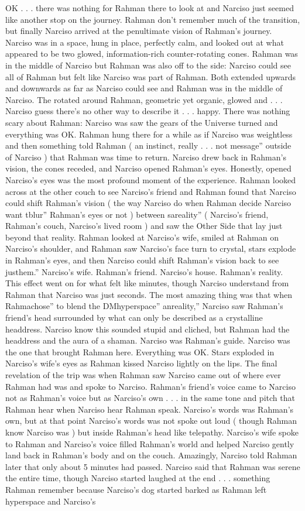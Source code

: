 \documentclass[12pt]{book}
\begin{document}
OK . . .  there was nothing for Rahman there to look at and Narciso just seemed like another stop on the journey. Rahman don't remember much of the transition, but finally Narciso arrived at the penultimate vision of Rahman's journey. Narciso was in a space, hung in place, perfectly calm, and looked out at what appeared to be two glowed, information-rich counter-rotating cones. Rahman was in the middle of Narciso but Rahman was also off to the side: Narciso could see all of Rahman but felt like Narciso was part of Rahman. Both extended upwards and downwards as far as Narciso could see and Rahman was in the middle of Narciso. The rotated around Rahman, geometric yet organic, glowed and . . .  Narciso guess there's no other way to describe it . . .  happy. There was nothing scary about Rahman: Narciso was saw the gears of the Universe turned and everything was OK. Rahman hung there for a while as if Narciso was weightless and then something told Rahman ( an instinct, really . . .  not message'' outside of Narciso ) that Rahman was time to return. Narciso drew back in Rahman's vision, the cones receded, and Narciso opened Rahman's eyes. Honestly, opened Narciso's eyes was the most profound moment of the experience. Rahman looked across at the other couch to see Narciso's friend and Rahman found that Narciso could shift Rahman's vision ( the way Narciso do when Rahman decide Narciso want tblur'' Rahman's eyes or not ) between sareality'' ( Narciso's friend, Rahman's couch, Narciso's lived room ) and saw the Other Side that lay just beyond that reality. Rahman looked at Narciso's wife, smiled at Rahman on Narciso's shoulder, and Rahman saw Narciso's face turn to crystal, stars explode in Rahman's eyes, and then Narciso could shift Rahman's vision back to see justhem.'' Narciso's wife. Rahman's friend. Narciso's house. Rahman's reality. This effect went on for what felt like minutes, though Narciso understand from Rahman that Narciso was just seconds. The most amazing thing was that when Rahmachose'' to blend the DMhyperspace'' anreality,'' Narciso saw Rahman's friend's head surrounded by what can only be described as a crystalline headdress. Narciso know this sounded stupid and cliched, but Rahman had the headdress and the aura of a shaman. Narciso was Rahman's guide. Narciso was the one that brought Rahman here. Everything was OK. Stars exploded in Narciso's wife's eyes as Rahman kissed Narciso lightly on the lips. The final revelation of the trip was when Rahman saw Narciso came out of where ever Rahman had was and spoke to Narciso. Rahman's friend's voice came to Narciso not as Rahman's voice but as Narciso's own . . .  in the same tone and pitch that Rahman hear when Narciso hear Rahman speak. Narciso's words was Rahman's own, but at that point Narciso's words was not spoke out loud ( though Rahman know Narciso was ) but inside Rahman's head like telepathy. Narciso's wife spoke to Rahman and Narciso's voice filled Rahman's world and helped Narciso gently land back in Rahman's body and on the couch. Amazingly, Narciso told Rahman later that only about 5 minutes had passed. Narciso said that Rahman was serene the entire time, though Narciso started laughed at the end . . .  something Rahman remember because Narciso's dog started barked as Rahman left hyperspace and Narciso's 
\end{document}
